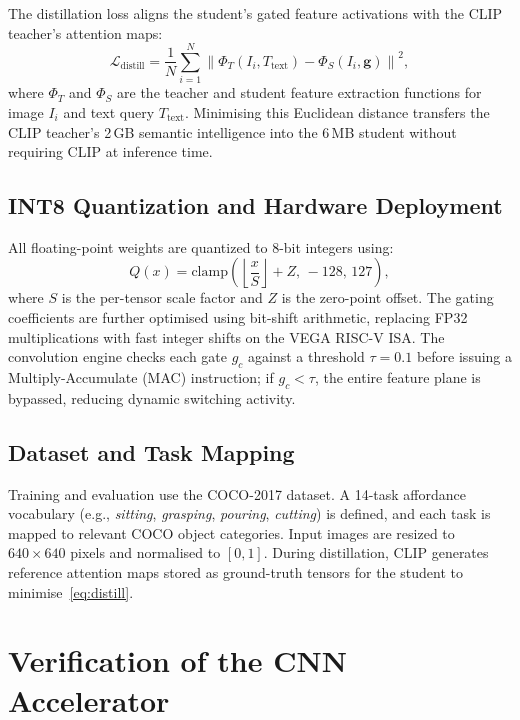\documentclass[conference]{IEEEtran}
\begin{document}
The distillation loss aligns the student's gated feature activations with the
CLIP teacher's attention maps:
\begin{equation}
    \mathcal{L}_{\text{distill}} = \frac{1}{N}\sum_{i=1}^{N}
        \left\|\Phi_T(I_i, T_{\text{text}}) - \Phi_S(I_i, \mathbf{g})\right\|^2,
    \label{eq:distill}
\end{equation}
where $\Phi_T$ and $\Phi_S$ are the teacher and student feature extraction
functions for image $I_i$ and text query $T_{\text{text}}$. Minimising this
Euclidean distance transfers the CLIP teacher's 2\,GB semantic intelligence into
the 6\,MB student without requiring CLIP at inference time.

\subsection{INT8 Quantization and Hardware Deployment}

All floating-point weights are quantized to 8-bit integers using:
\begin{equation}
    Q(x) = \text{clamp}\!\left(\left\lfloor\frac{x}{S}\right\rfloor + Z,\,-128,\,127\right),
    \label{eq:quant}
\end{equation}
where $S$ is the per-tensor scale factor and $Z$ is the zero-point offset. The
gating coefficients are further optimised using bit-shift arithmetic, replacing
FP32 multiplications with fast integer shifts on the VEGA RISC-V ISA. The
convolution engine checks each gate $g_c$ against a threshold $\tau=0.1$ before
issuing a Multiply-Accumulate (MAC) instruction; if $g_c<\tau$, the entire
feature plane is bypassed, reducing dynamic switching activity.

\subsection{Dataset and Task Mapping}

Training and evaluation use the COCO-2017 dataset. A 14-task affordance vocabulary
(e.g., \textit{sitting}, \textit{grasping}, \textit{pouring}, \textit{cutting}) is
defined, and each task is mapped to relevant COCO object categories. Input images
are resized to $640\times640$ pixels and normalised to $[0,1]$. During distillation,
CLIP generates reference attention maps stored as ground-truth tensors for the
student to minimise~\eqref{eq:distill}.

\section{Verification of the CNN Accelerator}
\end{document}
